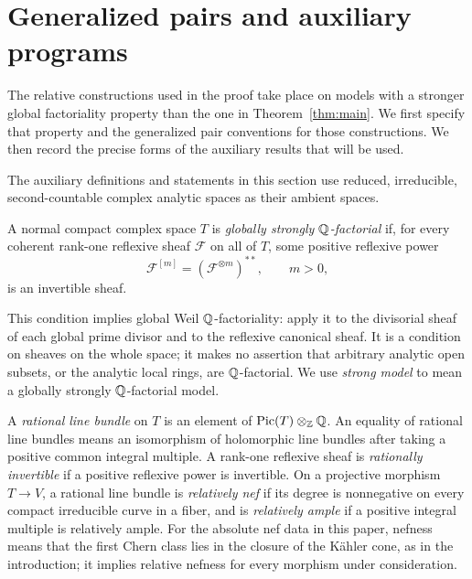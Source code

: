 \section{Generalized pairs and auxiliary programs}\label{sec:preliminaries}

The relative constructions used in the proof take place on models with a
stronger global factoriality property than the one in
Theorem~\ref{thm:main}.  We first specify that property and the generalized
pair conventions for those constructions.  We then record the precise
forms of the auxiliary results that will be used.

The auxiliary definitions and statements in this section use reduced,
irreducible, second-countable complex analytic spaces as their ambient
spaces.

\begin{definition}\label{def:strong-factoriality}
A normal compact complex space \(T\) is \emph{globally strongly
\(\mathbb{Q}\)-factorial} if, for every coherent rank-one reflexive sheaf
\(\mathcal F\) on all of \(T\), some positive reflexive power
\[
 \mathcal F^{[m]}=(\mathcal F^{\otimes m})^{**},\qquad m>0,
\]
is an invertible sheaf.
\end{definition}

This condition implies global Weil \(\mathbb{Q}\)-factoriality: apply it to the
divisorial sheaf of each global prime divisor and to the reflexive canonical
sheaf.  It is a condition on sheaves on the whole space; it makes no assertion
that arbitrary analytic open subsets, or the analytic local rings, are
\(\mathbb{Q}\)-factorial.  We use \emph{strong model} to mean a globally strongly
\(\mathbb{Q}\)-factorial model.

A \emph{rational line bundle} on \(T\) is an element of
\(\operatorname{Pic}(T)\otimes_{\mathbb{Z}}\mathbb{Q}\).  An equality of rational line bundles means an
isomorphism of holomorphic line bundles after taking a positive common
integral multiple.  A rank-one reflexive sheaf is \emph{rationally
invertible} if a positive reflexive power is invertible.  On a projective
morphism \(T\to V\), a rational line bundle is \emph{relatively nef} if
its degree is nonnegative on every compact irreducible curve in a fiber,
and is \emph{relatively ample} if a positive integral multiple is relatively
ample.  For the absolute nef data in this paper, nefness means that the
first Chern class lies in the closure of the K\"ahler cone, as in the
introduction; it implies relative nefness for every morphism under
consideration.

